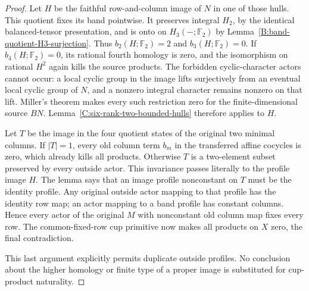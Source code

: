 \begin{proof}
Let $H$ be the faithful row-and-column image of $N$ in one of those
hulls.  This quotient fixes its band pointwise.  It preserves
integral $H_2$, by the identical balanced-tensor presentation, and
is onto on $H_3(-;\mathbb F_2)$ by
Lemma~\ref{B:band-quotient-H3-surjection}.
Thus $b_2(H;\mathbb F_2)=2$ and $b_3(H;\mathbb F_2)=0$.
If $b_4(H;\mathbb F_2)=0$, its rational fourth homology is zero,
and the isomorphism on rational $H^2$ again kills the source products.
The forbidden cyclic-character actors cannot occur: a local cyclic
group in the image lifts surjectively from an eventual local cyclic
group of $N$, and a nonzero integral character remains nonzero on
that lift.  Miller's theorem makes every such restriction zero for
the finite-dimensional source $BN$.
Lemma~\ref{C:six-rank-two-bounded-hulls} therefore applies to $H$.

Let $T$ be the image in the four quotient states of the original two
minimal columns.  If $|T|=1$, every old column term $b_m$ in the
transferred affine cocycles is zero, which already kills all products.
Otherwise $T$ is a two-element subset preserved by every outside
actor.  This invariance passes literally to the profile image $H$.
The lemma says that an image profile nonconstant on $T$ must be the
identity profile.  Any original outside actor mapping to that
profile has the identity row map; an actor mapping to a band profile
has constant columns.  Hence every actor of the original $M$ with
nonconstant old column map fixes every row.
The common-fixed-row cup primitive now makes all products on $X$
zero, the final contradiction.

This last argument explicitly permits duplicate outside profiles.
No conclusion about the higher homology or finite type of a proper
image is substituted for cup-product naturality.
\end{proof}
